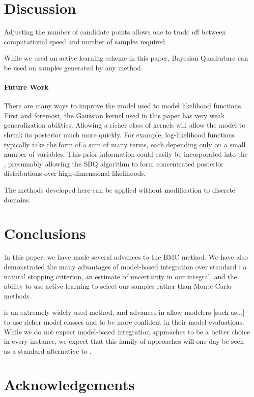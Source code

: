 \documentclass{article}
\begin{document}
\section{Discussion}

Adjusting the number of candidate points allows one to trade off between computational speed and number of samples required.

While we used an active learning scheme in this paper, Bayesian Quadrature can be used on samples generated by any method.

\paragraph{Future Work}There are many ways to improve the \gpb model used to model likelihood functions.  First and foremost, the Gaussian kernel used in this paper has very weak generalization abilities.  Allowing a richer class of kernels will allow the \gpb model to shrink its posterior much more quickly.  For example, log-likelihood functions typically take the form of a sum of many terms, each depending only on a small number of variables.  This prior information could easily be incorporated into the \gpb, presumably allowing the SBQ algorithm to form concentrated posterior distributions over high-dimensional likelihoods.

The methods developed here can be applied without modification to discrete domains.

\section{Conclusions}

 In this paper, we have made several advances to the BMC method.  We have also demonstrated the many advantages of model-based integration over standard : a natural stopping criterion, an estimate of uncertainty in our integral, and the ability to use active learning to select our samples rather than Monte Carlo methods.

 is an extremely widely used method, and advances in  allow modelers [such as...] to use richer model classes and to be more confident in their model evaluations.  While we do not expect model-based integration approaches to be a better choice in every instance, we expect that this family of approaches will one day be seen as a standard alternative to .

\section*{Acknowledgements}



\pagebreak


\end{document}
